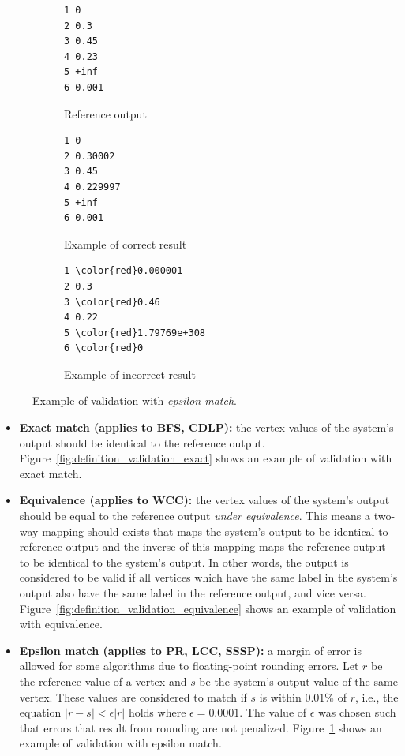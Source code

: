 \begin{figure}[h]
\centering
\begin{subfigure}{0.3\textwidth}
\begin{Verbatim}[frame=single]
1 0
2 0.3
3 0.45
4 0.23
5 +inf
6 0.001
\end{Verbatim}
\caption{Reference output}
\end{subfigure}
\begin{subfigure}{0.3\textwidth}
\begin{Verbatim}[frame=single]
1 0
2 0.30002
3 0.45
4 0.229997
5 +inf
6 0.001
\end{Verbatim}
\caption{Example of correct result}
\end{subfigure}
\begin{subfigure}{0.3\textwidth}
\begin{Verbatim}[frame=single,commandchars=\\\{\}]
1 \color{red}0.000001
2 0.3
3 \color{red}0.46
4 0.22
5 \color{red}1.79769e+308
6 \color{red}0
\end{Verbatim}
\caption{Example of incorrect result}
\end{subfigure}
\caption{Example of validation with \emph{epsilon match}.}
\label{fig:definition_validation_epsilon}
\end{figure}


\begin{itemize}

\item \textbf{Exact match (applies to BFS, CDLP):} the vertex values of the system's output should be identical to the reference output. Figure~\ref{fig:definition_validation_exact} shows an example of validation with exact match.

\item \textbf{Equivalence (applies to WCC):} the vertex values of the system's output should be equal to the reference output \emph{under equivalence}. This means a two-way mapping should exists that maps the system's output to be identical to reference output and the inverse of this mapping maps the reference output to be identical to the system's output. In other words, the output is considered to be valid if all vertices which have the same label in the system's output also have the same label in the reference output, and vice versa. Figure~\ref{fig:definition_validation_equivalence} shows an example of validation with equivalence.

\item \textbf{Epsilon match (applies to PR, LCC, SSSP):} a margin of error is allowed for some algorithms due to floating-point rounding errors. Let $r$ be the reference value of a vertex and $s$ be the system's output value of the same vertex. These values are considered to match if $s$ is within $0.01\%$ of $r$, i.e., the equation $|r-s| < \epsilon |r|$ holds where $\epsilon=0.0001$. The value of $\epsilon$ was chosen such that errors that result from rounding are not penalized. Figure~\ref{fig:definition_validation_epsilon} shows an example of validation with epsilon match.
\end{itemize}


